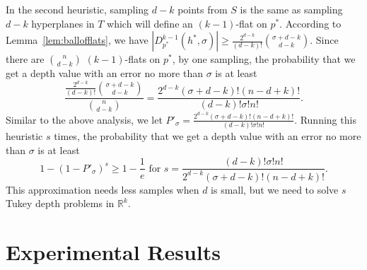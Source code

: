 \documentclass{patmorin}
\begin{document}
In the second heuristic, sampling $d - k$ points from $S$ is the same as sampling $d - k$ hyperplanes in $T$ which will define an $(k-1)$-flat on $p^{*}$. According to Lemma~\ref{lem:ballofflats}, we have $|D_{p^{*}}^{k-1}(h^{*},\sigma)| \geq \frac{2^{d-k}}{(d-k)!}\binom{\sigma + d-k}{d-k}$. Since there are $\binom{n}{d-k}$ $(k-1)$-flats on $p^{*}$, by one sampling, the probability that we get a depth value with an error no more than $\sigma$ is at least
\begin{equation}
  \label{eq:prbflats}
  \frac{\frac{2^{d-k}}{(d-k)!}\binom{\sigma + d-k}{d-k}}{\binom{n}{d-k}} = \frac{2^{d-k}(\sigma+d-k)!(n-d+k)!}{(d-k)!\sigma!n!}.
\end{equation}
Similar to the above analysis, we let $P'_{\sigma} = \frac{2^{d-k}(\sigma+d-k)!(n-d+k)!}{(d-k)!\sigma!n!}$. Running this heuristic $s$ times, the probability that we get a depth value with an error no more than $\sigma$ is at least
\begin{equation}
  \label{eq:prbappr2}
  1 - (1 - P'_{\sigma})^{s} \geq 1 - \frac{1}{e} \textrm{ for } s = \frac{(d-k)!\sigma!n!}{2^{d-k}(\sigma+d-k)!(n-d+k)!}.
\end{equation}
This approximation needs less samples when $d$ is small, but we need to solve $s$ Tukey depth problems in $\mathbb{R}^{k}$.




\section{Experimental Results}
\label{sec:experi}
\end{document}
